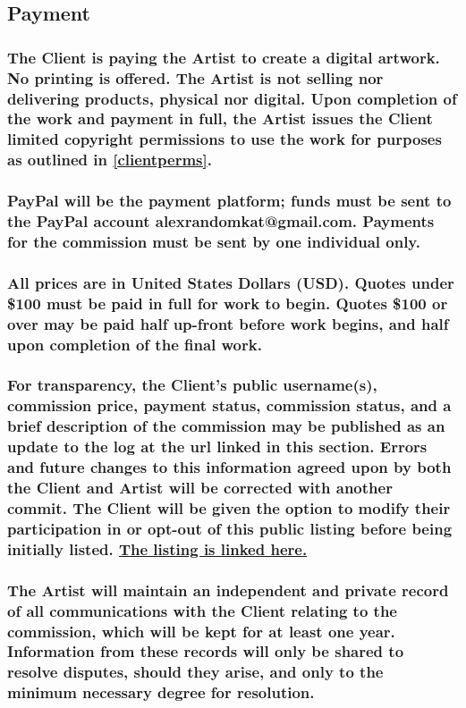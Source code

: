 \documentclass{article}
\begin{document}
\begin{flushleft}
	\leftskip=1cm
	\subsection{Payment} 
	\leftskip=2cm
		\subsubsection[Payment for a Service]{\normalfont The Client is paying the Artist to create a digital artwork. No printing is offered. The Artist is not selling nor delivering products, physical nor digital. Upon completion of the work and payment in full, the Artist issues the Client limited copyright permissions to use the work for purposes as outlined in \ref{clientperms}.}

		\subsubsection[Acceptable Payment Methods]{\normalfont PayPal will be the payment platform; funds must be sent to the PayPal account alexrandomkat@gmail.com. Payments for the commission must be sent by one individual only.}

		\subsubsection[Payment Plans]{\normalfont All prices are in United States Dollars (USD). Quotes under \$100 must be paid in full for work to begin. Quotes \$100 or over may be paid half up-front before work begins, and half upon completion of the final work.}

		\subsubsection[Public Recordkeeping]{\normalfont For transparency, the Client's public username(s), commission price, payment status, commission status, and a brief description of the commission may be published as an update to the log at the url linked in this section. Errors and future changes to this information agreed upon by both the Client and Artist will be corrected with another commit. The Client will be given the option to modify their participation in or opt-out of this public listing before being initially listed. \href{https://github.com/AlexRandomkat/alexrandomkatCommLog/blob/main/alexrandomkat-commlog-PUBLIC.pdf}{The listing is linked here.}}
		
		\subsubsection[Private Recordkeeping]{\normalfont The Artist will maintain an independent and private record of all communications with the Client relating to the commission, which will be kept for at least one year. Information from these records will only be shared to resolve disputes, should they arise, and only to the minimum necessary degree for resolution.}
		\hphantom{owo}
		

\end{flushleft}
\end{document}
